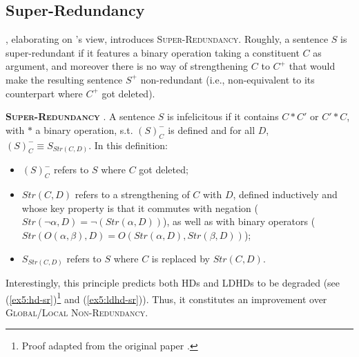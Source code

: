 \subsection{Super-Redundancy}

\textcite{Kalomoiros2024}, elaborating on \textcite{Katzir2014}'s view, introduces \textsc{Super-Redundancy}. Roughly, a sentence $S$ is super-redundant if it features a binary operation taking a constituent $C$ as argument, and moreover there is no way of strengthening $C$ to $C^+$ that would make the resulting sentence $S^+$ non-redundant (i.e., non-equivalent to its counterpart where $C^+$ got deleted).

\begin{exe}
	 {\textsc{\textbf{Super-Redundancy}} \parencite{Kalomoiros2024}. A sentence $S$ is infelicitous if it contains $C \ast C'$ or $C' \ast C$, with $\ast$ a binary operation, s.t. $(S)^-_C$ is defined and for all $D$, $(S)^-_C \equiv S_{Str(C, D)}$. In this definition:
		\begin{itemize}
			\item $(S)^-_C$ refers to $S$ where $C$ got deleted;
			\item  $Str(C, D)$ refers to a strengthening of $C$ with $D$, defined inductively and whose key property is that it commutes with negation ($Str(\neg\alpha, D) = \neg (Str(\alpha, D))$), as well as with binary operators ($Str(O(\alpha, \beta), D) = O(Str(\alpha, D), Str(\beta, D))$);
			\item $S_{Str(C, D)}$ refers to $S$ where $C$ is replaced by $Str(C, D)$.
	\end{itemize}}
\end{exe}


Interestingly, this principle predicts both HDs and LDHDs to be degraded (see (\ref{ex5:hd-sr})\footnote{Proof adapted from the original paper \parencite{Kalomoiros2024}.} and (\ref{ex5:ldhd-sr})). Thus, it constitutes an improvement over \textsc{Global/Local Non-Redundancy}.



